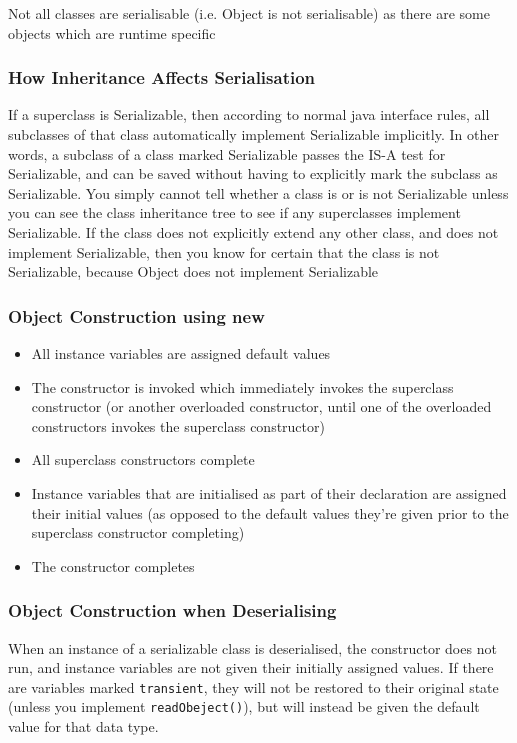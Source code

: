 Not all classes are serialisable (i.e. Object is not serialisable) as there are 
some objects which are runtime specific

\subsubsection{How Inheritance Affects Serialisation}
If a superclass is Serializable, then according to normal java interface rules, 
all subclasses of that class automatically implement Serializable implicitly.  
In other words, a subclass of a class marked Serializable passes the IS-A test 
for Serializable, and can be saved without having to explicitly mark the
    subclass as Serializable. You simply cannot tell whether a class is or is 
    not Serializable unless you can see the class inheritance tree to see if 
    any superclasses implement Serializable. If the class does not explicitly 
    extend any other class, and does not implement Serializable, then you know 
    for certain that the class is not Serializable, because Object does not 
        implement Serializable

\subsubsection{Object Construction using new}
\begin{itemize}
    \item All instance variables are assigned default values
    \item The constructor is invoked which immediately invokes the superclass 
    constructor (or another overloaded constructor, until one of the overloaded 
    constructors invokes the superclass constructor)
    \item All superclass constructors complete
    \item Instance variables that are initialised as part of their declaration 
    are assigned their initial values (as opposed to the default values they're 
    given prior to the superclass constructor completing)
    \item The constructor completes
\end{itemize}

\subsubsection{Object Construction when Deserialising}
When an instance of a serializable class is deserialised, the constructor does 
not run, and instance variables are not given their initially assigned values.  
If there are variables marked \verb#transient#, they will not be restored to 
their original state (unless you implement \verb#readObeject()#), but will 
instead be given the default value for that data type.

